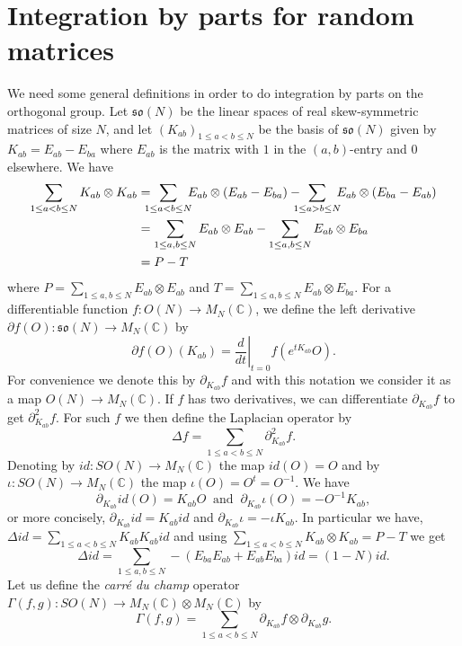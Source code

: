 \documentclass[11pt]{amsart}
\theoremstyle{definition}
\numberwithin{theorem}{section}
\newcommand{\bC}{\mathbb{C}}
\newcommand{\id}{\mathit{id}}
\newcommand{\ab}{\allowbreak}
\newcommand{\ds}{\displaystyle}
\begin{document}
\section{Integration by parts for random matrices}\label{sec:integration by parts for random matrices}

We need some general definitions in order to do integration
by parts on the orthogonal group. Let $\mathfrak{so}(N)$ be
the linear spaces of real skew-symmetric matrices of size
$N$, and let $(K_{ab})_{1\leq a< b\leq N}$ be the basis of
$\mathfrak{so}(N)$ given by $K_{ab}=E_{ab}-E_{ba}$ where
$E_{ab}$ is the matrix with $1$ in the $(a, b)$-entry and
$0$ elsewhere. We have
\begin{align*}
\sum_{1 \leq a < b \leq N} K_{a  b}\otimes K_{a b}
& = \kern-0.75em
\sum_{1 \leq a < b \leq N} \kern-0.5em E_{ab}\otimes (E_{ab} - E_{ba})
- \kern-0.75em
\sum_{1 \leq a > b \leq N} \kern-0.5em E_{ab} \otimes (E_{ba} - E_{ab}) \\
&=
\sum_{1 \leq a, b \leq N}  E_{ab}\otimes E_{ab} - \sum_{1\leq a, b\leq N}E_{ab}\otimes E_{ba}\\
&=P-T
\end{align*}
where $P= \sum_{1\leq a, b\leq N}E_{ab}\otimes E_{ab}$ and
$T=\sum_{1\leq a, b\leq N}E_{ab}\otimes E_{ba}$. For a
differentiable function $f: O(N) \to M_N(\mathbb{C})$, we
define the left derivative $\partial f(O): \mathfrak{so}(N)
\to M_N(\bC)$ by
$$
\partial f(O) (K_{ab})=\left.\frac{d}{d t}\right|_{t=0} f(e^{tK_{ab}}O).
$$ For convenience we denote this by $\partial_{K_{ab}}f$
and with this notation we consider it as a map $O(N) \to
M_N(\bC)$. If $f$ has two derivatives, we can differentiate
$\partial_{K_{ab}}f$ to get $\partial^2_{K_{ab}}f$. For such
$f$ we then define the Laplacian operator by
\[
\Delta f=\sum_{1\leq a< b\leq N}\partial_{K_{ab}}^2f.
\]
Denoting by $\id:SO(N)\to M_N(\mathbb{C})$ the map
$\id(O)=O$ and by $\iota:SO(N)\to M_N(\mathbb{C})$ the map
$\iota(O)=O^t=O^{-1}$. We have
\[
\partial_{K_{ab}}id(O)=K_{ab}O\ \text{ and }\ \partial_{K_{ab}}\iota(O)=-O^{-1}K_{ab},
\]
or more concisely, $\partial_{K_{ab}}\id=K_{ab}\id$ and
$\partial_{K_{ab}}\iota = - \iota K_{ab}$. In particular we
have, $\Delta \id =\ab\ds\sum_{1\leq a< b\leq N}K_{ab}
K_{ab}\id$ and using $\ds\sum_{1\leq a< b\leq
  N}K_{ab}\otimes K_{ab}=P-T$ we get
$$\Delta \id=\sum_{1 \leq a , b\leq N} -(E_{ba}E_{ab}+E_{ab} E_{ba}) \id = (1-N)\id.$$
Let us define the \textit{carré du champ} operator $\Gamma(f,g):SO(N)\to M_N(\mathbb{C})\otimes  M_N(\mathbb{C})$ by
\[
\Gamma(f,g)= \sum_{1\leq a< b\leq N}\partial_{K_{ab}}f\otimes \partial_{K_{ab}}g.
\]
\end{document}
